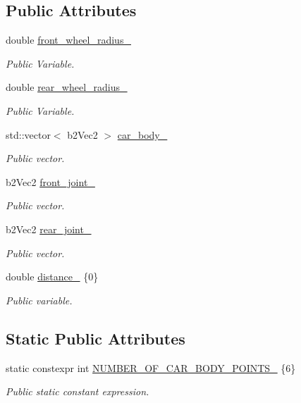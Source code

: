 \subsection*{Public Attributes}
\begin{DoxyCompactItemize}
\item 
double \hyperlink{classCarParameters_ab66832af7618ebe04364630c92850096}{front\+\_\+wheel\+\_\+radius\+\_\+}
\begin{DoxyCompactList}\small\item\em Public Variable. \end{DoxyCompactList}\item 
double \hyperlink{classCarParameters_a6d3c3fc1c4eef292a7f536da2a089bbd}{rear\+\_\+wheel\+\_\+radius\+\_\+}
\begin{DoxyCompactList}\small\item\em Public Variable. \end{DoxyCompactList}\item 
std\+::vector$<$ b2\+Vec2 $>$ \hyperlink{classCarParameters_a304345d7fd7771c87421e87785bce810}{car\+\_\+body\+\_\+}
\begin{DoxyCompactList}\small\item\em Public vector. \end{DoxyCompactList}\item 
b2\+Vec2 \hyperlink{classCarParameters_a471bcf264de846ca28e52bde8780f6a8}{front\+\_\+joint\+\_\+}
\begin{DoxyCompactList}\small\item\em Public vector. \end{DoxyCompactList}\item 
b2\+Vec2 \hyperlink{classCarParameters_aec19cf9d1c6ab5f00ac5ff166ee0015a}{rear\+\_\+joint\+\_\+}
\begin{DoxyCompactList}\small\item\em Public vector. \end{DoxyCompactList}\item 
double \hyperlink{classCarParameters_a79406bde604364dbb6ff6e1a19198303}{distance\+\_\+} \{0\}
\begin{DoxyCompactList}\small\item\em Public variable. \end{DoxyCompactList}\end{DoxyCompactItemize}
\subsection*{Static Public Attributes}
\begin{DoxyCompactItemize}
\item 
static constexpr int \hyperlink{classCarParameters_a9cd45ac0f506d33d551c86eff1e0fa05}{N\+U\+M\+B\+E\+R\+\_\+\+O\+F\+\_\+\+C\+A\+R\+\_\+\+B\+O\+D\+Y\+\_\+\+P\+O\+I\+N\+T\+S\+\_\+} \{6\}
\begin{DoxyCompactList}\small\item\em Public static constant expression. \end{DoxyCompactList}\end{DoxyCompactItemize}


